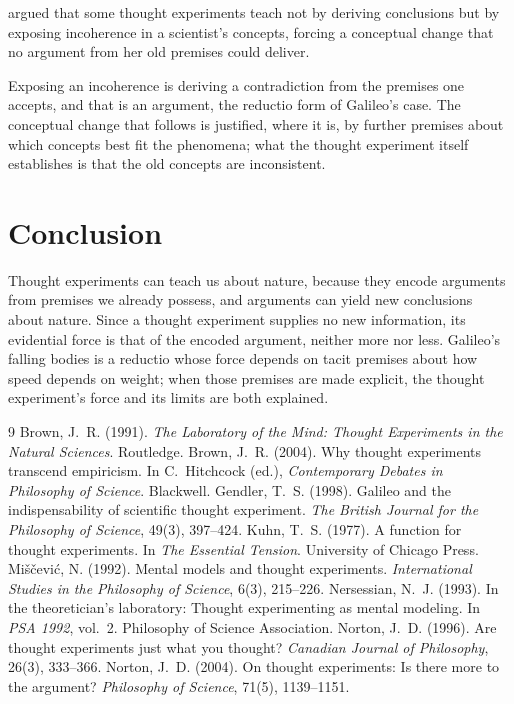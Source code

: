 \documentclass{situationist-preprint}
\begin{document}
\begin{objection}[Reconceptualization]
\citet{Kuhn1977} argued that some thought experiments teach not by deriving conclusions but by exposing incoherence in a scientist's concepts, forcing a conceptual change that no argument from her old premises could deliver.
\end{objection}

\begin{reply}
Exposing an incoherence is deriving a contradiction from the premises one accepts, and that is an argument, the reductio form of Galileo's case. The conceptual change that follows is justified, where it is, by further premises about which concepts best fit the phenomena; what the thought experiment itself establishes is that the old concepts are inconsistent.
\end{reply}

\section{Conclusion}

Thought experiments can teach us about nature, because they encode arguments from premises we already possess, and arguments can yield new conclusions about nature. Since a thought experiment supplies no new information, its evidential force is that of the encoded argument, neither more nor less. Galileo's falling bodies is a reductio whose force depends on tacit premises about how speed depends on weight; when those premises are made explicit, the thought experiment's force and its limits are both explained.

\begin{thebibliography}{9}\small
{} Brown, J.~R. (1991). \emph{The Laboratory of the Mind: Thought Experiments in the Natural Sciences}. Routledge.
 Brown, J.~R. (2004). Why thought experiments transcend empiricism. In C.~Hitchcock (ed.), \emph{Contemporary Debates in Philosophy of Science}. Blackwell.
 Gendler, T.~S. (1998). Galileo and the indispensability of scientific thought experiment. \emph{The British Journal for the Philosophy of Science}, 49(3), 397--424.
 Kuhn, T.~S. (1977). A function for thought experiments. In \emph{The Essential Tension}. University of Chicago Press.
 Mi\v{s}\v{c}evi\'c, N. (1992). Mental models and thought experiments. \emph{International Studies in the Philosophy of Science}, 6(3), 215--226.
 Nersessian, N.~J. (1993). In the theoretician's laboratory: Thought experimenting as mental modeling. In \emph{PSA 1992}, vol.~2. Philosophy of Science Association.
 Norton, J.~D. (1996). Are thought experiments just what you thought? \emph{Canadian Journal of Philosophy}, 26(3), 333--366.
 Norton, J.~D. (2004). On thought experiments: Is there more to the argument? \emph{Philosophy of Science}, 71(5), 1139--1151.
\end{thebibliography}
\end{document}
